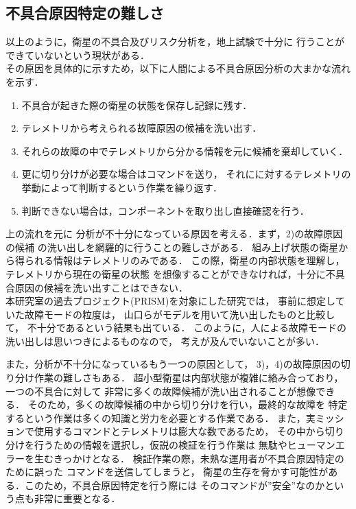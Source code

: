 \documentclass[11pt]{article}
\begin{document}
\subsection{不具合原因特定の難しさ}
以上のように，衛星の不具合及びリスク分析を，地上試験で十分に
行うことができていないという現状がある．\\
その原因を具体的に示すため，以下に人間による不具合原因分析の大まかな流れを示す．
\begin{enumerate}[1)]
   \item 不具合が起きた際の衛星の状態を保存し記録に残す． 
   \item テレメトリから考えられる故障原因の候補を洗い出す．
   \item それらの故障の中でテレメトリから分かる情報を元に候補を棄却していく．
   \item 更に切り分けが必要な場合はコマンドを送り，
   それにに対するテレメトリの挙動によって判断するという作業を繰り返す．
   \item 判断できない場合は，コンポーネントを取り出し直接確認を行う．
\end{enumerate}
上の流れを元に
分析が不十分になっている原因を考える．まず，2)の故障原因の候補
の洗い出しを網羅的に行うことの難しさがある．
組み上げ状態の衛星から得られる情報はテレメトリのみである．
この際，衛星の内部状態を理解し，テレメトリから現在の衛星の状態
を想像することができなければ，十分に不具合原因の候補を洗い出すことはできない．\\
本研究室の過去プロジェクト(PRISM)を対象にした研究では，
事前に想定していた故障モードの粒度は，
山口ら\cite{Yamaguchi2014}がモデルを用いて洗い出したものと比較して，
不十分であるという結果も出ている．
このように，人による故障モードの洗い出しは思いつきによるものなので，
考えが及んでいないことが多い．

また，分析が不十分になっているもう一つの原因として，
3)，4)の故障原因の切り分け作業の難しさもある．
超小型衛星は内部状態が複雑に絡み合っており，一つの不具合に対して
非常に多くの故障候補が洗い出されることが想像できる．
そのため，多くの故障候補の中から切り分けを行い，最終的な故障を
特定するという作業は多くの知識と労力を必要とする作業である．
また，実ミッションで使用するコマンドとテレメトリは膨大な数であるため，
その中から切り分けを行うための情報を選択し，仮説の検証を行う作業は
無駄やヒューマンエラーを生むきっかけとなる．
検証作業の際，未熟な運用者が不具合原因特定のために誤った%
コマンドを送信してしまうと，
衛星の生存を脅かす可能性がある．このため，不具合原因特定を行う際には
そのコマンドが”安全”なのかという点も非常に重要となる．
\end{document}
